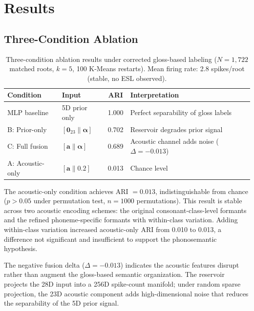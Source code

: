\documentclass{article}
\begin{document}
\section{Results}

\subsection{Three-Condition Ablation}

\begin{table}[h]
\centering
\begin{tabular}{llcl}
\toprule
Condition & Input & ARI & Interpretation \\
\midrule
MLP baseline & 5D prior only & 1.000 & Perfect separability of gloss labels \\
B: Prior-only & $[\mathbf{0}_{23} \| \boldsymbol{\alpha}]$ & 0.702 &
  Reservoir degrades prior signal \\
C: Full fusion & $[\mathbf{a} \| \boldsymbol{\alpha}]$ & 0.689 &
  Acoustic channel adds noise ($\Delta = -0.013$) \\
A: Acoustic-only & $[\mathbf{a} \| \mathbf{0.2}]$ & 0.013 &
  Chance level \\
\bottomrule
\end{tabular}
\caption{Three-condition ablation results under corrected gloss-based
  labeling ($N = 1{,}722$ matched roots, $k = 5$, 100 K-Means restarts).
  Mean firing rate: 2.8 spikes/root (stable, no ESL observed).}
\label{tab:ablation}
\end{table}

The acoustic-only condition achieves ARI $= 0.013$, indistinguishable
from chance ($p > 0.05$ under permutation test, $n = 1000$ permutations).
This result is stable across two acoustic encoding schemes: the original
consonant-class-level formants and the refined phoneme-specific formants
with within-class variation. Adding within-class variation increased
acoustic-only ARI from 0.010 to 0.013, a difference not significant and
insufficient to support the phonosemantic hypothesis.

The negative fusion delta ($\Delta = -0.013$) indicates the acoustic
features disrupt rather than augment the gloss-based semantic organization.
The reservoir projects the 28D input into a 256D spike-count manifold;
under random sparse projection, the 23D acoustic component adds
high-dimensional noise that reduces the separability of the 5D prior
signal.
\end{document}
